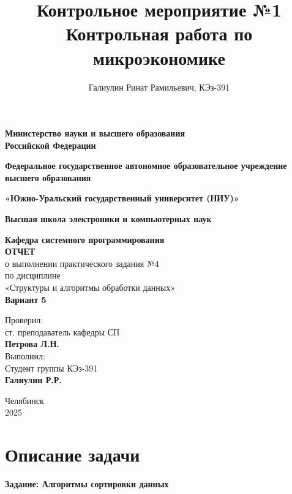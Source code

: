 \documentclass[a4paper,12pt]{article}
\title{\textbf{Контрольное мероприятие №1} \\
	Контрольная работа по микроэкономике }
\author{Галиулин Ринат Рамильевич, КЭз-391}
\date{}
\begin{document}
	\begin{titlepage}
		\begin{center}
			{\large \textbf{Министерство науки и высшего образования \\ Российской Федерации}}
			
			{\large\textbf{Федеральное государственное автономное образовательное учреждение высшего образования}}
			
			{\large \textbf{«Южно-Уральский государственный университет (НИУ)»}}
			
			{\large \textbf{Высшая школа электроники и компьютерных наук}}
			
			{\large \textbf{Кафедра системного программирования}\\[2cm]
			}
			\textbf{ОТЧЕТ}\\[0.2cm]
			о выполнении практического задания №4\\[0.2cm]
			по дисциплине\\[0.2cm]
			«Структуры и алгоритмы обработки данных»\\[0.2cm]
			\textbf{Вариант 5}\\[3cm]
		\end{center}
		
		\begin{flushright}
			Проверил:\\[0.2cm]
			ст. преподаватель кафедры СП\\[0.2cm]
			\textbf{Петрова Л.Н.}\\[1cm]
						
			Выполнил:\\[0.2cm]
			Студент группы КЭз-391\\[0.2cm]
			\textbf{Галиулин Р.Р.}\\[0.2cm]
			
		\end{flushright}
		\vfill{}
		
		\begin{center}
			Челябинск \\ 2025
		\end{center}
	\end{titlepage}
	\newpage
	
	\tableofcontents
	
	\setcounter{page}{2}
	\newpage
	\section{Описание задачи}
	\textbf{Задание: Алгоритмы сортировки данных}
	
\end{document}
